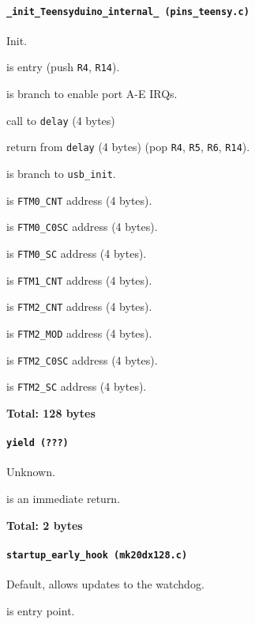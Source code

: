 \paragraph{\texttt{\_init\_Teensyduino\_internal\_ (pins\_teensy.c)}}
Init.

 is entry (push \texttt{R4}, \texttt{R14}).

 is branch to enable port A-E IRQs.

 call to \texttt{delay} (4 bytes)

 return from \texttt{delay} (4 bytes) (pop \texttt{R4},
\texttt{R5}, \texttt{R6}, \texttt{R14}).

 is branch to \texttt{usb\_init}.

\vspace{1em}

 is \texttt{FTM0\_CNT} address (4 bytes).

 is \texttt{FTM0\_C0SC} address (4 bytes).

 is \texttt{FTM0\_SC} address (4 bytes).

 is \texttt{FTM1\_CNT} address (4 bytes).

 is \texttt{FTM2\_CNT} address (4 bytes).

 is \texttt{FTM2\_MOD} address (4 bytes).

 is \texttt{FTM2\_C0SC} address (4 bytes).

 is \texttt{FTM2\_SC} address (4 bytes).

\textbf{Total: 128 bytes}

\paragraph{\texttt{yield (???)}} Unknown.

 is an immediate return.

\textbf{Total: 2 bytes}

\paragraph{\texttt{startup\_early\_hook (mk20dx128.c)}} Default, allows updates
to the watchdog.

 is entry point.

